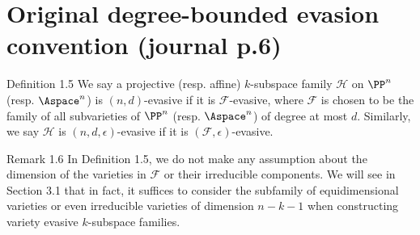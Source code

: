\section*{Original degree-bounded evasion convention (journal p.6)}
\begin{result}{Definition 1.5}
We say a projective (resp. affine) $k$-subspace family $\mathcal H$ on $\PP^n$ (resp. $\Aspace^n$) is $(n,d)$-evasive if it is $\mathcal F$-evasive, where $\mathcal F$ is chosen to be the family of all subvarieties of $\PP^n$ (resp. $\Aspace^n$) of degree at most $d$. Similarly, we say $\mathcal H$ is $(n,d,\epsilon)$-evasive if it is $(\mathcal F,\epsilon)$-evasive.
\end{result}
\begin{result}{Remark 1.6}
In Definition 1.5, we do not make any assumption about the dimension of the varieties in $\mathcal F$ or their irreducible components. We will see in Section 3.1 that in fact, it suffices to consider the subfamily of equidimensional varieties or even irreducible varieties of dimension $n-k-1$ when constructing variety evasive $k$-subspace families.
\end{result}
